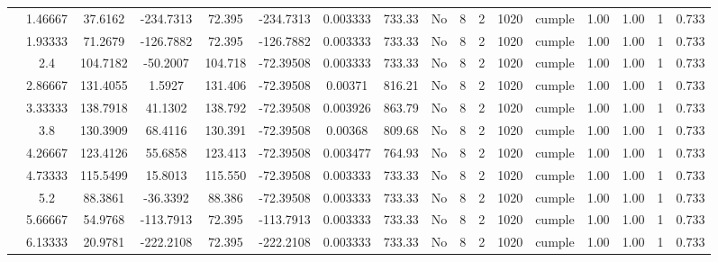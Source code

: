 \begin{table}[H]
{\begin{tabular}{|c|c|c|c|c|c|c|c|c|c|c|c|c|c|c|c|c|}
\cline{2-17}        & 1.46667 & 37.6162 & -234.7313 & 72.395 & -234.7313 & 0.003333 & 733.33 & No  & 8   & 2   & 1020 & \cellcolor[rgb]{ .776,  .937,  .808}cumple & 1.00 & 1.00 & 1   & 0.733 \bigstrut\\
\cline{2-17}        & 1.93333 & 71.2679 & -126.7882 & 72.395 & -126.7882 & 0.003333 & 733.33 & No  & 8   & 2   & 1020 & \cellcolor[rgb]{ .776,  .937,  .808}cumple & 1.00 & 1.00 & 1   & 0.733 \bigstrut\\
\cline{2-17}        & 2.4 & 104.7182 & -50.2007 & 104.718 & -72.39508 & 0.003333 & 733.33 & No  & 8   & 2   & 1020 & \cellcolor[rgb]{ .776,  .937,  .808}cumple & 1.00 & 1.00 & 1   & 0.733 \bigstrut\\
\cline{2-17}        & 2.86667 & 131.4055 & 1.5927 & 131.406 & -72.39508 & 0.00371 & 816.21 & No  & 8   & 2   & 1020 & \cellcolor[rgb]{ .776,  .937,  .808}cumple & 1.00 & 1.00 & 1   & 0.733 \bigstrut\\
\cline{2-17}        & 3.33333 & 138.7918 & 41.1302 & 138.792 & -72.39508 & 0.003926 & 863.79 & No  & 8   & 2   & 1020 & \cellcolor[rgb]{ .776,  .937,  .808}cumple & 1.00 & 1.00 & 1   & 0.733 \bigstrut\\
\cline{2-17}        & 3.8 & 130.3909 & 68.4116 & 130.391 & -72.39508 & 0.00368 & 809.68 & No  & 8   & 2   & 1020 & \cellcolor[rgb]{ .776,  .937,  .808}cumple & 1.00 & 1.00 & 1   & 0.733 \bigstrut\\
\cline{2-17}        & 4.26667 & 123.4126 & 55.6858 & 123.413 & -72.39508 & 0.003477 & 764.93 & No  & 8   & 2   & 1020 & \cellcolor[rgb]{ .776,  .937,  .808}cumple & 1.00 & 1.00 & 1   & 0.733 \bigstrut\\
\cline{2-17}        & 4.73333 & 115.5499 & 15.8013 & 115.550 & -72.39508 & 0.003333 & 733.33 & No  & 8   & 2   & 1020 & \cellcolor[rgb]{ .776,  .937,  .808}cumple & 1.00 & 1.00 & 1   & 0.733 \bigstrut\\
\cline{2-17}        & 5.2 & 88.3861 & -36.3392 & 88.386 & -72.39508 & 0.003333 & 733.33 & No  & 8   & 2   & 1020 & \cellcolor[rgb]{ .776,  .937,  .808}cumple & 1.00 & 1.00 & 1   & 0.733 \bigstrut\\
\cline{2-17}        & 5.66667 & 54.9768 & -113.7913 & 72.395 & -113.7913 & 0.003333 & 733.33 & No  & 8   & 2   & 1020 & \cellcolor[rgb]{ .776,  .937,  .808}cumple & 1.00 & 1.00 & 1   & 0.733 \bigstrut\\
\cline{2-17}        & 6.13333 & 20.9781 & -222.2108 & 72.395 & -222.2108 & 0.003333 & 733.33 & No  & 8   & 2   & 1020 & \cellcolor[rgb]{ .776,  .937,  .808}cumple & 1.00 & 1.00 & 1   & 0.733 \bigstrut\\

\end{tabular}}
\end{table}
